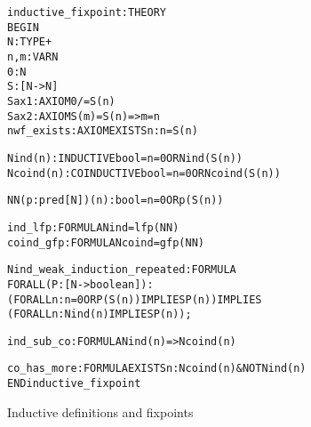 {\begin{figure}[htb]\begin{boxedminipage}{\textwidth}%
{\smaller\smaller\begin{alltt}
inductive_fixpoint: THEORY
 BEGIN
  N: TYPE+
  n, m: VAR N
  0: N
  S: [N -> N]
  Sax1: AXIOM 0 /= S(n)
  Sax2: AXIOM S(m) = S(n) => m = n
  % Assume a non-wellfounded element
  nwf_exists: AXIOM EXISTS n: n = S(n)

  Nind(n):     INDUCTIVE bool = n = 0 OR Nind(S(n))
  Ncoind(n): COINDUCTIVE bool = n = 0 OR Ncoind(S(n))

  % NN is the predicate transformer corresponding to the (co)inductive defs
  NN(p: pred[N])(n): bool = n = 0 OR p(S(n))

  % These use the lfp and gfp defs from the prelude mucalculus theory
  ind_lfp: FORMULA Nind = lfp(NN)
  coind_gfp: FORMULA Ncoind = gfp(NN)

  % Repeat Nind_weak_induction, which is proved from lfp_induction
  Nind_weak_induction_repeated: FORMULA 
    FORALL (P: [N -> boolean]):
      (FORALL n: n = 0 OR P(S(n)) IMPLIES P(n)) IMPLIES
       (FORALL n: Nind(n) IMPLIES P(n));

  % Inductive definitions are a subset of coinductive
  ind_sub_co: FORMULA Nind(n) => Ncoind(n)

  % Because there is a non-wellfounded element, we can show that
  % the coinductive set is larger.
  co_has_more: FORMULA EXISTS n: Ncoind(n) & NOT Nind(n)
 END inductive_fixpoint
\end{alltt}}\end{boxedminipage}%
\caption{Inductive definitions and fixpoints}\label{inductive-fixpoints}\end{figure}}

